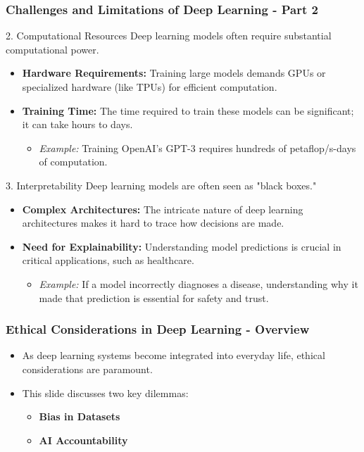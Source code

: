 \documentclass[aspectratio=169]{beamer}
\begin{document}
\begin{frame}[fragile]
    \frametitle{Challenges and Limitations of Deep Learning - Part 2}
    \begin{block}{2. Computational Resources}
        Deep learning models often require substantial computational power.
        
        \begin{itemize}
            \item \textbf{Hardware Requirements:} Training large models demands GPUs or specialized hardware (like TPUs) for efficient computation.
            \item \textbf{Training Time:} The time required to train these models can be significant; it can take hours to days.
            \begin{itemize}
                \item \textit{Example:} Training OpenAI's GPT-3 requires hundreds of petaflop/s-days of computation.
            \end{itemize}
        \end{itemize}
    \end{block}
    
    \begin{block}{3. Interpretability}
        Deep learning models are often seen as "black boxes."
        
        \begin{itemize}
            \item \textbf{Complex Architectures:} The intricate nature of deep learning architectures makes it hard to trace how decisions are made.
            \item \textbf{Need for Explainability:} Understanding model predictions is crucial in critical applications, such as healthcare.
            \begin{itemize}
                \item \textit{Example:} If a model incorrectly diagnoses a disease, understanding why it made that prediction is essential for safety and trust.
            \end{itemize}
        \end{itemize}
    \end{block}
\end{frame}

\begin{frame}[fragile]
  \frametitle{Ethical Considerations in Deep Learning - Overview}
  \begin{itemize}
    \item As deep learning systems become integrated into everyday life, ethical considerations are paramount.
    \item This slide discusses two key dilemmas:
    \begin{itemize}
      \item \textbf{Bias in Datasets}
      \item \textbf{AI Accountability}
    \end{itemize}
  \end{itemize}
\end{frame}
\end{document}
